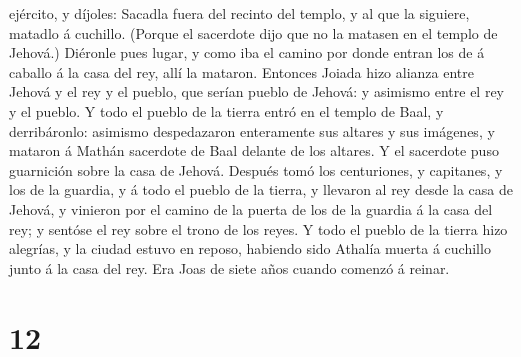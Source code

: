 ejército, y díjoles: Sacadla fuera del recinto del templo, y al que la
siguiere, matadlo á cuchillo. (Porque el sacerdote dijo que no la
matasen en el templo de Jehová.)  Diéronle pues lugar, y
como iba el camino por donde entran los de á caballo á la casa del rey,
allí la mataron.  Entonces Joiada hizo alianza entre Jehová
y el rey y el pueblo, que serían pueblo de Jehová: y asimismo entre el
rey y el pueblo.  Y todo el pueblo de la tierra entró en el
templo de Baal, y derribáronlo: asimismo despedazaron enteramente sus
altares y sus imágenes, y mataron á Mathán sacerdote de Baal delante de
los altares. Y el sacerdote puso guarnición sobre la casa de Jehová.
 Después tomó los centuriones, y capitanes, y los de la
guardia, y á todo el pueblo de la tierra, y llevaron al rey desde la
casa de Jehová, y vinieron por el camino de la puerta de los de la
guardia á la casa del rey; y sentóse el rey sobre el trono de los reyes.
 Y todo el pueblo de la tierra hizo alegrías, y la ciudad
estuvo en reposo, habiendo sido Athalía muerta á cuchillo junto á la
casa del rey.  Era Joas de siete años cuando comenzó á
reinar.

\hypertarget{section-11}{%
\section{12}\label{section-11}}

